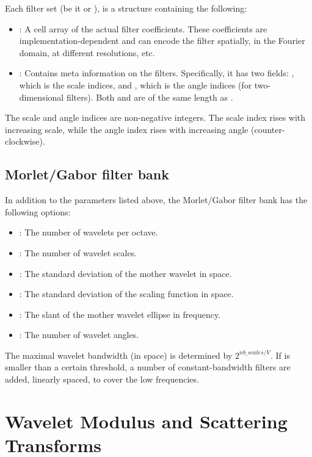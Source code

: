 \documentclass[twocolumn]{article}
\begin{document}
Each filter set (be it  or ), is a structure  containing the following:
\begin{itemize}
	\item {}: A cell array of the actual filter coefficients. These coefficients are implementation-dependent and can encode the filter spatially, in the Fourier domain, at different resolutions, etc.
	\item {}: Contains meta information on the filters. Specifically, it has two fields: , which is the scale indices, and , which is the angle indices (for two-dimensional filters). Both  and  are of the same length as .
\end{itemize}

The scale and angle indices are non-negative integers. The scale index rises with increasing scale, while the angle index rises with increasing angle (counter-clockwise).

\subsection{Morlet/Gabor filter bank}

In addition to the parameters listed above, the Morlet/Gabor filter bank has the following options:
\begin{itemize}
	\item {}: The number of wavelets per octave.
	\item {}: The number of wavelet scales.
	\item {}: The standard deviation of the mother wavelet in space.
	\item {}: The standard deviation of the scaling function in space.
	\item {}: The slant of the mother wavelet ellipse in frequency.
	\item {}: The number of wavelet angles.
\end{itemize}
The maximal wavelet bandwidth (in space) is determined by $2^{nb\_scales/V}$. If  is smaller than a certain threshold, a number of constant-bandwidth filters are added, linearly spaced, to cover the low frequencies.

\section{Wavelet Modulus and Scattering Transforms}
\end{document}

